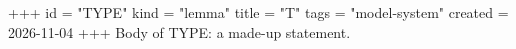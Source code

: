 +++
id = "TYPE"
kind = "lemma"
title = "T"
tags = "model-system"
created = 2026-11-04
+++
Body of TYPE: a made-up statement.
